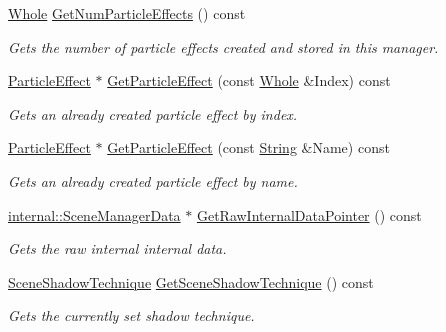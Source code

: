 \begin{DoxyCompactItemize}
\hyperlink{namespaceMezzanine_adcbb6ce6d1eb4379d109e51171e2e493}{Whole} \hyperlink{classMezzanine_1_1SceneManager_a730f48b359f0028d7db491facd95d95d}{GetNumParticleEffects} () const 
\begin{DoxyCompactList}\small\item\em Gets the number of particle effects created and stored in this manager. \item\end{DoxyCompactList}\item 
\hyperlink{classMezzanine_1_1ParticleEffect}{ParticleEffect} $\ast$ \hyperlink{classMezzanine_1_1SceneManager_a2e23ffc9c81b105ebf476e81dbcde74d}{GetParticleEffect} (const \hyperlink{namespaceMezzanine_adcbb6ce6d1eb4379d109e51171e2e493}{Whole} \&Index) const 
\begin{DoxyCompactList}\small\item\em Gets an already created particle effect by index. \item\end{DoxyCompactList}\item 
\hyperlink{classMezzanine_1_1ParticleEffect}{ParticleEffect} $\ast$ \hyperlink{classMezzanine_1_1SceneManager_a3a6f2b9e9b442fdee17fd4d934d08d85}{GetParticleEffect} (const \hyperlink{namespaceMezzanine_acf9fcc130e6ebf08e3d8491aebcf1c86}{String} \&Name) const 
\begin{DoxyCompactList}\small\item\em Gets an already created particle effect by name. \item\end{DoxyCompactList}\item 
\hyperlink{classMezzanine_1_1internal_1_1SceneManagerData}{internal::SceneManagerData} $\ast$ \hyperlink{classMezzanine_1_1SceneManager_a1acfb4dbc4005a3bd3f673534b6edec8}{GetRawInternalDataPointer} () const 
\begin{DoxyCompactList}\small\item\em Gets the raw internal internal data. \item\end{DoxyCompactList}\item 
\hyperlink{classMezzanine_1_1SceneManager_a8149cd1ec188e0d57935d71c6a7134c6}{SceneShadowTechnique} \hyperlink{classMezzanine_1_1SceneManager_a87b4d1dabaf1acffc55b95609d14817e}{GetSceneShadowTechnique} () const 
\begin{DoxyCompactList}\small\item\em Gets the currently set shadow technique. \item\end{DoxyCompactList}\item 

\end{DoxyCompactItemize}
